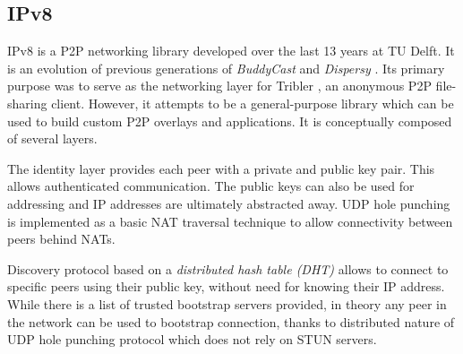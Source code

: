 


\subsection{IPv8}

IPv8 \cite{ipv8} is a P2P networking library developed over the last 13 years at TU Delft. It is an evolution of previous generations of \textit{BuddyCast} \cite{buddycast} and \textit{Dispersy} \cite{dispersy}. Its primary purpose was to serve as the networking layer for Tribler \cite{tribler}, an anonymous P2P file-sharing client. However, it attempts to be a general-purpose library which can be used to build custom P2P overlays and applications. It is conceptually composed of several layers.

The identity layer provides each peer with a private and public key pair. This allows authenticated communication. The public keys can also be used for addressing and IP addresses are ultimately abstracted away.
UDP hole punching is implemented as a basic NAT traversal technique to allow connectivity between peers behind NATs.

Discovery protocol based on a \textit{distributed hash table (DHT)} allows to connect to specific peers using their public key, without need for knowing their IP address. While there is a list of trusted bootstrap servers provided, in theory any peer in the network can be used to bootstrap connection, thanks to distributed nature of UDP hole punching protocol which does not rely on STUN servers.

